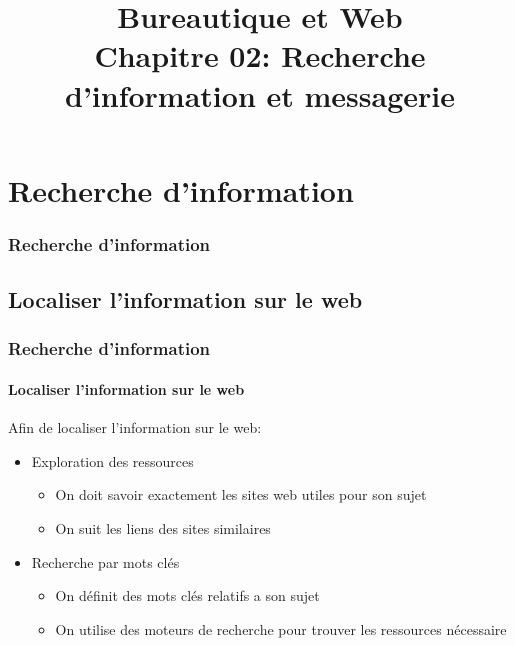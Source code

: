 \documentclass[xcolor=table]{beamer}
\title[BWEB: 02- RI et Gmail] %
{Bureautique et Web \\Chapitre 02: Recherche d'information et messagerie}
\begin{document}
\section{Recherche d'information}

\begin{frame}
\frametitle{Recherche d'information}

\begin{center}
\end{center}

\end{frame}

\subsection{Localiser l'information sur le web}

\begin{frame}
\frametitle{Recherche d'information}
\framesubtitle{Localiser l'information sur le web}

Afin de localiser l'information sur le web: 
\begin{itemize}
	\item Exploration des ressources 
	\begin{itemize}
		\item On doit savoir exactement les sites web utiles pour son sujet 
		\item On suit les liens des sites similaires
	\end{itemize}
	\item Recherche par mots clés
	\begin{itemize}
		\item On définit des mots clés relatifs a son sujet  
		\item On utilise des moteurs de recherche pour trouver les ressources nécessaire
	\end{itemize}
\end{itemize} 

\end{frame}
\end{document}
